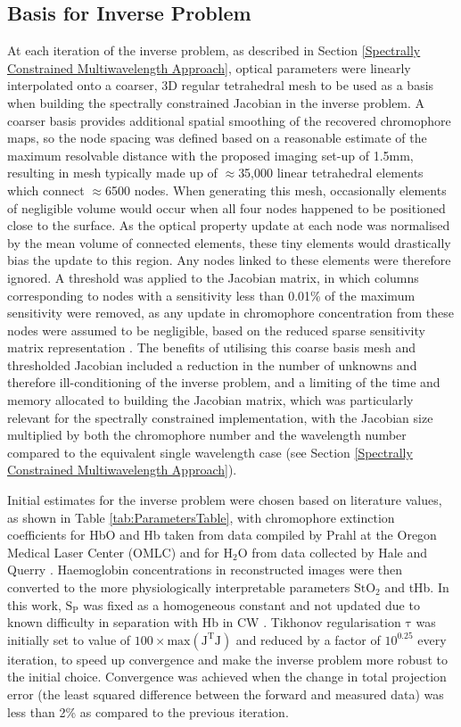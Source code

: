 \documentclass[twoside]{bhamthesis}
\theoremstyle{definition}
\begin{document}
\subsection{Basis for Inverse Problem}

At each iteration of the inverse problem, as described in Section \ref{Spectrally Constrained Multiwavelength Approach}, optical parameters were linearly interpolated onto a coarser, 3D regular tetrahedral mesh to be used as a basis when building the spectrally constrained Jacobian in the inverse problem. A coarser basis provides additional spatial smoothing of the recovered chromophore maps, so the node spacing was defined based on a reasonable estimate of the maximum resolvable distance with the proposed imaging set-up of 1.5mm, resulting in mesh typically made up of $\approx$35,000 linear tetrahedral elements which connect $\approx$6500 nodes. When generating this mesh, occasionally elements of negligible volume would occur when all four nodes happened to be positioned close to the surface. As the optical property update at each node was normalised by the mean volume of connected elements, these tiny elements would drastically bias the update to this region. Any nodes linked to these elements were therefore ignored. A threshold was applied to the Jacobian matrix, in which columns corresponding to nodes with a sensitivity less than 0.01\% of the maximum sensitivity were removed, as any update in chromophore concentration from these nodes were assumed to be negligible, based on the reduced sparse sensitivity matrix representation \cite{wu2015fast,eames2008efficient}. The benefits of utilising this coarse basis mesh and thresholded Jacobian included a reduction in the number of unknowns and therefore ill-conditioning of the inverse problem, and a limiting of the time and memory allocated to building the Jacobian matrix, which was particularly relevant for the spectrally constrained implementation, with the Jacobian size multiplied by both the chromophore number and the wavelength number compared to the equivalent single wavelength case (see 
Section \ref{Spectrally Constrained Multiwavelength Approach}).

Initial estimates for the inverse problem were chosen based on literature values, as shown in Table \ref{tab:ParametersTable}, with chromophore extinction coefficients for HbO and Hb taken from data compiled by Prahl at the Oregon Medical Laser Center (OMLC) \cite{prahl1999tabulated} and for $\mathrm{H_2O}$ from data collected by Hale and Querry \cite{hale1973optical}. Haemoglobin concentrations in reconstructed images were then converted to the more physiologically interpretable parameters $\mathrm{StO_2}$ and tHb. In this work, $\mathrm{S_P}$ was fixed as a homogeneous constant and not updated due to known difficulty in separation with Hb in CW \cite{corlu2005diffuse}. Tikhonov regularisation $\mathrm{\tau}$ was initially set to value of $\mathrm{100\times max(J^{T}J)}$ and reduced by a factor of $10^{0.25}$ every iteration, to speed up convergence and make the inverse problem more robust to the initial choice. Convergence was achieved when the change in total projection error (the least squared difference between the forward and measured data) was less than 2\% as compared to the previous iteration. 
\end{document}
